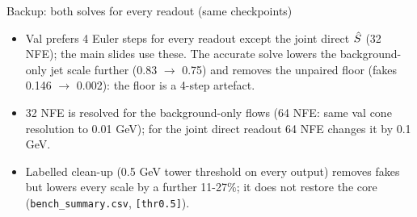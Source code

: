 \begin{frame}{Backup: both solves for every readout (same checkpoints)}


\vspace{0.4em}
{\scriptsize
\begin{itemize}\setlength\itemsep{0.1em}
\item Val prefers 4 Euler steps for every readout except the joint direct $\hat S$ (32 NFE); the main
  slides use these. The accurate solve lowers the background-only jet scale further (0.83 $\to$ 0.75)
  and removes the unpaired floor (fakes 0.146 $\to$ 0.002): the floor is a 4-step artefact.
\item 32 NFE is resolved for the background-only flows (64 NFE: same val cone resolution to 0.01 GeV);
  for the joint direct readout 64 NFE changes it by 0.1 GeV.
\item Labelled clean-up (0.5 GeV tower threshold on every output) removes fakes but lowers every
  scale by a further 11-27\%; it does not restore the core (\texttt{bench\_summary.csv}, \texttt{[thr0.5]}).
\end{itemize}}
\end{frame}

